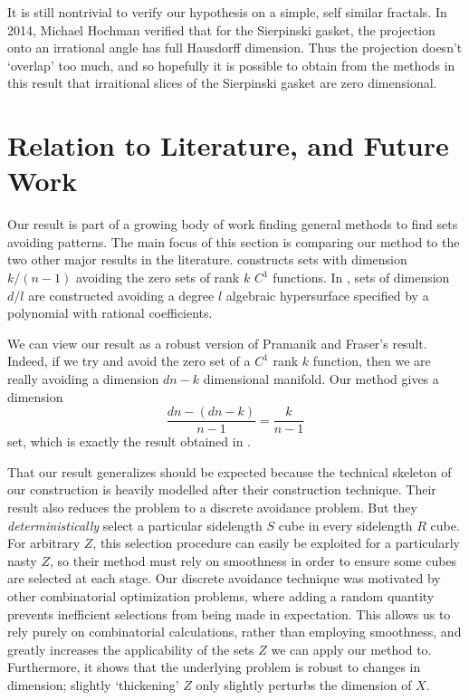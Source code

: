 \documentclass[usenames,dvipsnames]{article}
\theoremstyle{plain}
\theoremstyle{plain}
\begin{document}
It is still nontrivial to verify our hypothesis on a simple, self similar fractals. In 2014, Michael Hochman verified that for the Sierpinski gasket,
the projection onto an irrational angle has full Hausdorff dimension. Thus the projection doesn't `overlap' too much, and so hopefully it is possible to obtain from the methods in this result that irraitional slices of the Sierpinski gasket are zero dimensional.

\section{Relation to Literature, and Future Work}

Our result is part of a growing body of work finding general methods to find sets avoiding patterns. The main focus of this section is comparing our method to the two other major results in the literature. \cite{MalabikaRob} constructs sets with dimension $k/(n-1)$ avoiding the zero sets of rank $k$ $C^1$ functions. In \cite{Mathe}, sets of dimension $d/l$ are constructed avoiding a degree $l$ algebraic hypersurface specified by a polynomial with rational coefficients.

We can view our result as a robust version of Pramanik and Fraser's result. Indeed, if we try and avoid the zero set of a $C^1$ rank $k$ function, then we are really avoiding a dimension $dn - k$ dimensional manifold. Our method gives a dimension
%
\[ \frac{dn - (dn - k)}{n - 1} = \frac{k}{n - 1} \]
%
set, which is exactly the result obtained in \cite{MalabikaRob}.

That our result generalizes \cite{MalabikaRob} should be expected because the technical skeleton of our construction is heavily modelled after their construction technique. Their result also reduces the problem to a discrete avoidance problem. But they {\it deterministically} select a particular sidelength $S$ cube in every sidelength $R$ cube. For arbitrary $Z$, this selection procedure can easily be exploited for a particularly nasty $Z$, so their method must rely on smoothness in order to ensure some cubes are selected at each stage. Our discrete avoidance technique was motivated by other combinatorial optimization problems, where adding a random quantity prevents inefficient selections from being made in expectation. This allows us to rely purely on combinatorial calculations, rather than employing smoothness, and greatly increases the applicability of the sets $Z$ we can apply our method to. Furthermore, it shows that the underlying problem is robust to changes in dimension; slightly `thickening' $Z$ only slightly perturbs the dimension of $X$.
\end{document}
